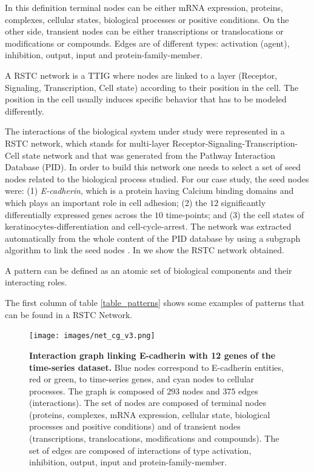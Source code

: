 In this definition terminal nodes can be either mRNA expression, proteins,  complexes, cellular states, biological processes or positive conditions. 
On the other side, transient nodes can be either transcriptions or translocations or modifications or compounds. Edges are of different types:
activation (agent), inhibition, output, input and protein-family-member.

\begin{definition} 
A RSTC network is a TTIG where nodes are linked to a layer (Receptor, Signaling, Transcription, Cell state) according to their position in the cell. 
The position in the cell  usually induces specific behavior that has to be modeled differently. 
\end{definition}



The interactions of the biological system under study were represented in
 a RSTC network, which stands for  multi-layer Receptor-Signaling-Transcription-Cell state network and that was generated from the Pathway Interaction Database (PID).
In order to build this network one needs to select a set of seed nodes related to the biological process studied.
For our case study, the seed nodes were:  (1) \emph{E-cadherin}, which is a protein having Calcium binding domains and which plays an important role in cell adhesion;
(2) the $12$ significantly differentially expressed genes across the $10$ time-points; and (3) the cell states of keratinocytes-differentiation and cell-cycle-arrest. 
The network was extracted automatically from the whole content of the PID database by using a subgraph algorithm to link the seed nodes \cite{guziolowski2012automatic}. 
In  we show the RSTC network obtained. 



\begin{definition}[Pattern] \label{def:pattern}

A pattern can be defined as an atomic set of biological components and their interacting roles. 

\end{definition}


The first column of table \ref{table_patterns} shows  some examples of patterns that can be found in a RSTC Network.

\begin{figure}[!p]
 \centering
 \texttt{[image: images/net\_cg\_v3.png]}
\caption{{\bf  Interaction graph linking E-cadherin with 12 genes of the time-series dataset.} Blue nodes correspond to E-cadherin entities, red or green, to time-series genes, 
and cyan nodes to cellular processes. The graph is composed of $293$ nodes and $375$ edges (interactions).
The set of nodes are composed of terminal nodes (proteins, complexes, mRNA expression, cellular state, biological processes and positive conditions) and of transient
nodes (transcriptions, translocations, modifications and compounds). The set of edges are composed of interactions of type activation, inhibition, output, 
input and protein-family-member.} 
 \label{fig:network}
\end{figure}

